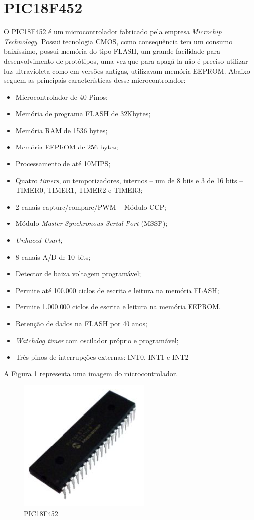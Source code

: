 \section{PIC18F452}
O PIC18F452 é um microcontrolador fabricado pela empresa \emph{Microchip Technology}. Possui tecnologia CMOS, como consequência tem um consumo baixíssimo, possui memória do tipo FLASH, um grande facilidade para desenvolvimento de protótipos, uma vez que para apagá-la não é preciso utilizar luz ultravioleta como em versões antigas, utilizavam memória EEPROM. Abaixo seguem as principais características desse microcontrolador:

\begin{itemize}
\item Microcontrolador de 40 Pinos;
\item Memória de programa FLASH de 32Kbytes;
\item Memória RAM de 1536 bytes;
\item Memória EEPROM de 256 bytes;
\item Processamento de até 10MIPS;
\item Quatro \emph{timers}, ou temporizadores, internos – um de 8 bits e 3 de 16 bits – TIMER0, TIMER1, TIMER2 e TIMER3;
\item 2 canais capture/compare/PWM – Módulo CCP;
\item Módulo \emph{Master Synchronous Serial Port} (MSSP);
\item \emph{Unhaced Usart;}
\item 8 canais A/D de 10 bits;
\item Detector de baixa voltagem programável;
\item Permite até 100.000 ciclos de escrita e leitura na memória FLASH;
\item Permite 1.000.000 ciclos de escrita e leitura na memória EEPROM.
\item Retenção de dados na FLASH por 40 anos;
\item \emph{Watchdog timer} com oscilador próprio e programável;
\item Três pinos de interrupções externas: INT0, INT1 e INT2
\end{itemize}

A Figura \ref{fig:pic} representa uma imagem do microcontrolador.

\begin{figure}[htp]
	\centering
	\includegraphics[scale=1]{images/pic.png}
	\caption{PIC18F452}	
	\label{fig:pic}	
\end{figure}

